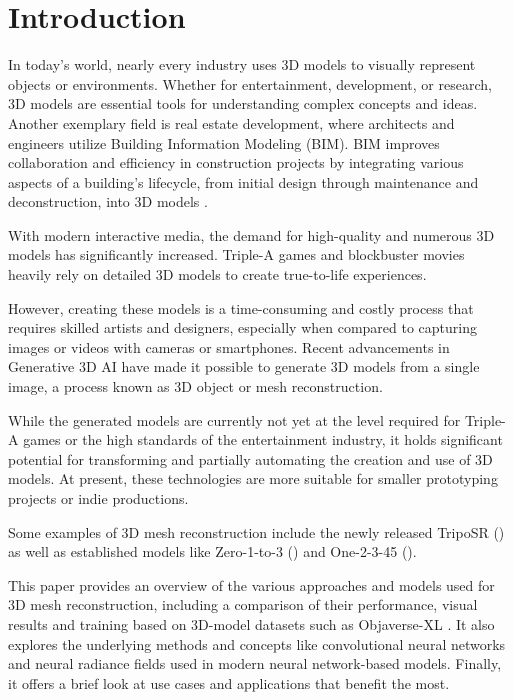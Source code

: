

\section{Introduction}
\label{section:Introduction}
In today's world, nearly every industry uses 3D models to visually represent objects or environments. Whether for entertainment, development, or research, 3D models are essential tools for understanding complex concepts and ideas.
Another exemplary field is real estate development, where architects and engineers utilize Building Information Modeling (BIM). BIM improves collaboration and efficiency in construction projects by integrating various aspects of a building's lifecycle, from initial design through maintenance and deconstruction, into 3D models \autocite{azhar_building_2020}.


With modern interactive media, the demand for high-quality and numerous 3D models has significantly increased. Triple-A games and blockbuster movies heavily rely on detailed 3D models to create true-to-life experiences.

However, creating these models is a time-consuming and costly process that requires skilled artists and designers, especially when compared to capturing images or videos with cameras or smartphones. Recent advancements in Generative 3D AI have made it possible to generate 3D models from a single image, a process known as 3D object or mesh reconstruction.

While the generated models are currently not yet at the level required for Triple-A games or the high standards of the entertainment industry, it holds significant potential for transforming and partially automating the creation and use of 3D models. At present, these technologies are more suitable for smaller prototyping projects or indie productions.

Some examples of 3D mesh reconstruction include the newly released TripoSR (\textcite{tochilkin_triposr_2024}) as well as established models like Zero-1-to-3 (\textcite{liu_zero-1--3_2023}) and One-2-3-45 (\textcite{liu_one-2-3-45_2023}).

This paper provides an overview of the various approaches and models used for 3D mesh reconstruction, including a comparison of their performance, visual results and training based on 3D-model datasets such as Objaverse-XL \autocite{deitke_objaverse-xl_2023}.
It also explores the underlying methods and concepts like convolutional neural networks and neural radiance fields \autocite{mildenhall_nerf_2021} used in modern neural network-based models.
Finally, it offers a brief look at use cases and applications that benefit the most.

